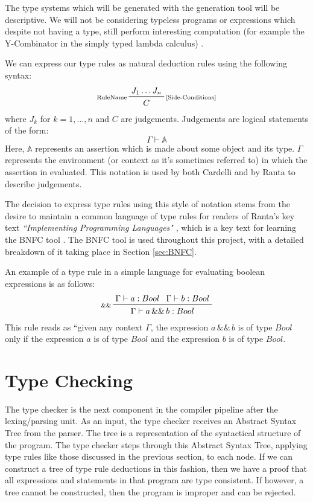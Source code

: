 \documentclass{UoYCSproject}
\begin{document}
The type systems which will be generated with the generation tool will be
descriptive. We will not be considering typeless programs or expressions which
despite not having a type, still perform interesting computation (for example
the Y-Combinator in the simply typed lambda calculus) \cite{NeilJones} 
\cite[p.~28]{SimonPeytonJones} \cite[p.~155]{SimonPeytonJones}.

We can express our type rules as natural deduction rules using the following
syntax:
\begin{displaymath}
    \prftree[l,r]{\scriptsize [Side-Conditions]}{\scriptsize RuleName}{J_1 \dots J_n}{C}
\end{displaymath}
where $J_k$ for $k=1, \dots ,n$ and $C$ are judgements. Judgements are logical 
statements of the form:
\begin{displaymath}
    \Gamma \vdash \mathbb{A}
\end{displaymath}
Here, $\mathbb{A}$ represents an assertion which is made about some object and
its type. $\Gamma$ represents the environment (or context as it's sometimes
referred to) in which the assertion in evaluated. This notation is used by both
Cardelli \cite[p.~8]{CSHandbook} and by Ranta \cite[\S4.4, p.~60]{Ranta} to 
describe judgements.

The decision to express type rules using this style of notation stems from the 
desire to maintain a common language of type rules for readers of Ranta's key
text \textit{``Implementing Programming Languages"} \cite{Ranta}, which is a key 
text for learning the BNFC tool \cite{BNFC}. The BNFC tool is used throughout
this project, with a detailed breakdown of it taking place in Section 
\ref{sec:BNFC}. 

An example of a type rule in a simple language for evaluating boolean 
expressions is as follows:
\begin{displaymath}
    \prftree[l]{\scriptsize \&\&}{\Gamma \vdash a:Bool}{\Gamma \vdash b:Bool}{\Gamma \vdash a \, \&\& \, b: Bool}
\end{displaymath}
This rule reads as ``given any context $\Gamma$, the expression $a \, \&\& \, b$
is of type $Bool$ only if the expression $a$ is of type $Bool$ and the expression $b$
is of type $Bool$.

\section{Type Checking}
\label{sec:Chap1TypeChecking}
The type checker is the next component in the compiler pipeline after the
lexing/parsing unit. As an input, the type checker receives an Abstract Syntax
Tree from the parser. The tree is a representation of the syntactical structure
of the program. The type checker steps through this Abstract Syntax Tree, applying
type rules like those discussed in the previous section, to each node. If we
can construct a tree of type rule deductions in this fashion, then we have a
proof that all expressions and statements in that program are type consistent.
If however, a tree cannot be constructed, then the program is improper and
can be rejected.
\end{document}
